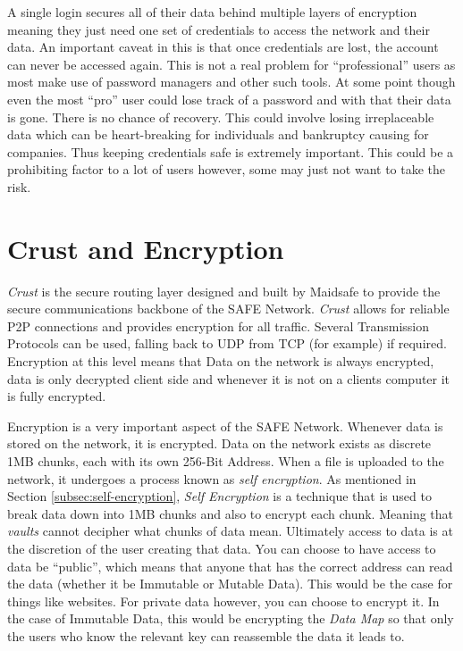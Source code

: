 A single login secures all of their data behind multiple layers of encryption meaning they just need one set of credentials to access the network and their data. An important caveat in this is that once credentials are lost, the account can never be accessed again. This is not a real problem for ``professional'' users as most make use of password managers and other such tools. At some point though even the most ``pro'' user could lose track of a password and with that their data is gone. There is no chance of recovery. This could involve losing irreplaceable data which can be heart-breaking for individuals and bankruptcy causing for companies. Thus keeping credentials safe is extremely important. This could be a prohibiting factor to a lot of users however, some may just not want to take the risk.

\section{Crust and Encryption}

\textit{Crust} is the secure routing layer designed and built by Maidsafe to provide the secure communications backbone of the SAFE Network. \textit{Crust} allows for reliable P2P connections and provides encryption for all traffic. Several Transmission Protocols can be used, falling back to UDP from TCP (for example) if required. Encryption at this level means that Data on the network is always encrypted, data is only decrypted client side and whenever it is not on a clients computer it is fully encrypted.

Encryption is a very important aspect of the SAFE Network. Whenever data is stored on the network, it is encrypted. Data on the network exists as discrete 1MB chunks, each with its own 256-Bit Address. When a file is uploaded to the network, it undergoes a process known as \textit{self encryption}. As mentioned in Section \ref{subsec:self-encryption}, \textit{Self Encryption} is a technique that is used to break data down into 1MB chunks and also to encrypt each chunk. Meaning that \textit{vaults} cannot decipher what chunks of data mean. Ultimately access to data is at the discretion of the user creating that data. You can choose to have access to data be ``public'', which means that anyone that has the correct address can read the data (whether it be Immutable or Mutable Data). This would be the case for things like websites. For private data however, you can choose to encrypt it. In the case of Immutable Data, this would be encrypting the \textit{Data Map} so that only the users who know the relevant key can reassemble the data it leads to.

